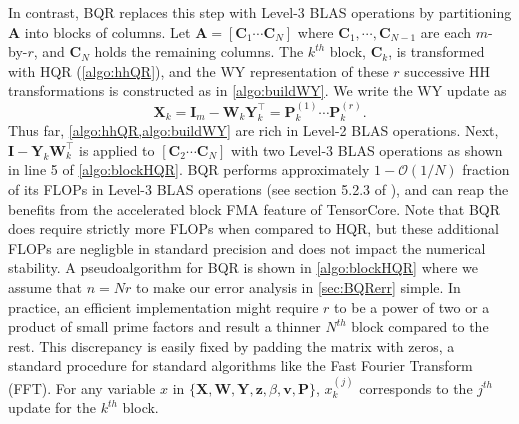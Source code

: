 \documentclass[review,onefignum,onetabnum]{siamart190516}
\newcommand{\bb}[1]{\mathbf{#1}}
\newcommand{\cO}{\mathcal{O}}
\begin{document}
In contrast, BQR replaces this step with Level-3 BLAS operations by partitioning $\bb{A}$ into blocks of columns.
Let $\bb{A} = [\bb{C}_1 \cdots  \bb{C}_N]$ where $\bb{C}_1,\cdots,\bb{C}_{N-1}$ are each $m$-by-$r$, and $\bb{C}_N$ holds the remaining columns.
The $k^{th}$ block, $\bb{C}_k$, is transformed with HQR (\cref{algo:hhQR}), and the WY representation of these $r$ successive HH transformations is constructed as in \cref{algo:buildWY}.
We write the WY update as
\begin{equation}
\bb{X}_k = \bb{I}_m -\bb{W}_{k}\bb{Y}_{k}^{\top} = \bb{P}_k^{(1)}\cdots\bb{P}_{k}^{(r)}.
\end{equation}
Thus far, \cref{algo:hhQR,algo:buildWY} are rich in Level-2 BLAS operations.
Next, $\bb{I} -\bb{Y}_{k}\bb{W}_{k}^{\top}$ is applied to $[\bb{C}_2 \cdots  \bb{C}_N]$ with two Level-3 BLAS operations as shown in line 5 of \cref{algo:blockHQR}.
BQR performs approximately $1-\cO(1/N)$ fraction of its FLOPs in Level-3 BLAS operations (see section 5.2.3 of \cite{golub2013matrix}), and can reap the benefits from the accelerated block FMA feature of TensorCore. 
Note that BQR does require strictly more FLOPs when compared to HQR, but these additional FLOPs are negligble in standard precision and does not impact the numerical stability.
A pseudoalgorithm for BQR is shown in \cref{algo:blockHQR} where we assume that $n=Nr$ to make our error analysis in \cref{sec:BQRerr} simple.
In practice, an efficient implementation might require $r$ to be a power of two or a product of small prime factors and result a thinner $N^{th}$ block compared to the rest. 
This discrepancy is easily fixed by padding the matrix with zeros, a standard procedure for standard algorithms like the Fast Fourier Transform (FFT).
For any variable $x$ in $\{\bb{X},\bb{W}, \bb{Y}, \bb{z}, \beta, \bb{v}, \bb{P}\}$,  $x_k^{(j)}$ corresponds to the $j^{th}$ update for the $k^{th}$ block.
\end{document}
